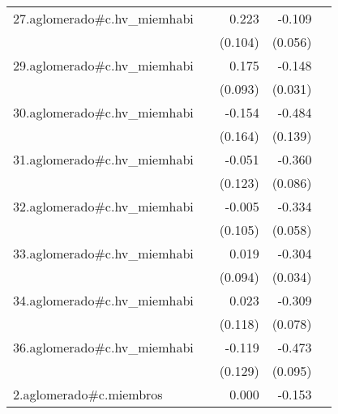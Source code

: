 {\begin{longtable}{l*{4}{D{.}{.}{-1}}}
\addlinespace
27.aglomerado#c.hv\_miemhabi&                     &       0.223\sym{*}  &      -0.109         &                     \\
            &                     &     (0.104)         &     (0.056)         &                     \\
\addlinespace
29.aglomerado#c.hv\_miemhabi&                     &       0.175         &      -0.148\sym{***}&                     \\
            &                     &     (0.093)         &     (0.031)         &                     \\
\addlinespace
30.aglomerado#c.hv\_miemhabi&                     &      -0.154         &      -0.484\sym{***}&                     \\
            &                     &     (0.164)         &     (0.139)         &                     \\
\addlinespace
31.aglomerado#c.hv\_miemhabi&                     &      -0.051         &      -0.360\sym{***}&                     \\
            &                     &     (0.123)         &     (0.086)         &                     \\
\addlinespace
32.aglomerado#c.hv\_miemhabi&                     &      -0.005         &      -0.334\sym{***}&                     \\
            &                     &     (0.105)         &     (0.058)         &                     \\
\addlinespace
33.aglomerado#c.hv\_miemhabi&                     &       0.019         &      -0.304\sym{***}&                     \\
            &                     &     (0.094)         &     (0.034)         &                     \\
\addlinespace
34.aglomerado#c.hv\_miemhabi&                     &       0.023         &      -0.309\sym{***}&                     \\
            &                     &     (0.118)         &     (0.078)         &                     \\
\addlinespace
36.aglomerado#c.hv\_miemhabi&                     &      -0.119         &      -0.473\sym{***}&                     \\
            &                     &     (0.129)         &     (0.095)         &                     \\
\addlinespace
2.aglomerado#c.miembros&                     &       0.000         &      -0.153\sym{***}&                     \\

\end{longtable}}
